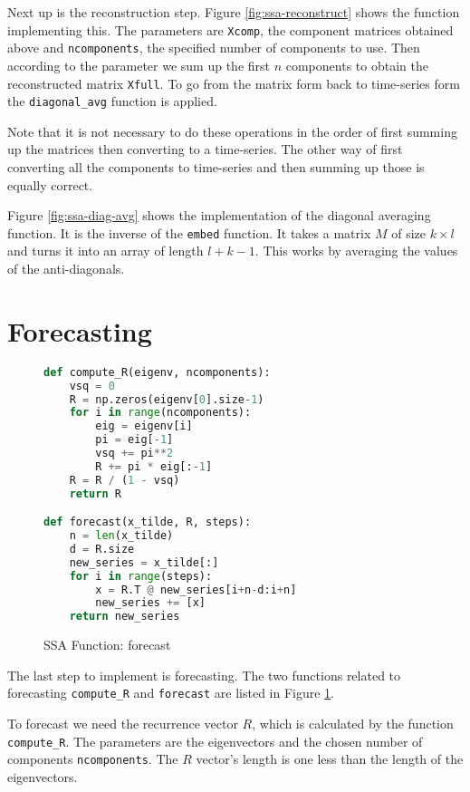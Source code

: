 Next up is the reconstruction step. Figure \ref{fig:ssa-reconstruct} shows the function implementing this. The parameters are \texttt{Xcomp}, the component matrices obtained above and \texttt{ncomponents}, the specified number of components to use. Then according to the parameter we sum up the first $n$ components to obtain the reconstructed matrix \texttt{Xfull}. To go from the matrix form back to time-series form the \texttt{diagonal\_avg} function is applied. 

Note that it is not necessary to do these operations in the order of first summing up the matrices then converting to a time-series. The other way of first converting all the components to time-series and then summing up those is equally correct. 

Figure \ref{fig:ssa-diag-avg} shows the implementation of the diagonal averaging function. It is the inverse of the \texttt{embed} function. It takes a matrix $M$ of size $k \times l$ and turns it into an array of length $l+k-1$. This works by averaging the values of the anti-diagonals. 

\section{Forecasting}

\begin{figure}
\begin{singlespace}
\begin{lstlisting}[language=Python]
def compute_R(eigenv, ncomponents):
    vsq = 0
    R = np.zeros(eigenv[0].size-1)
    for i in range(ncomponents):
        eig = eigenv[i]
        pi = eig[-1]
        vsq += pi**2
        R += pi * eig[:-1]
    R = R / (1 - vsq)
    return R

def forecast(x_tilde, R, steps):
    n = len(x_tilde)
    d = R.size
    new_series = x_tilde[:]
    for i in range(steps):
        x = R.T @ new_series[i+n-d:i+n]
        new_series += [x]
    return new_series
\end{lstlisting}
\end{singlespace}
\caption{SSA Function: forecast}    
\label{fig:ssa-forecast}
\end{figure}

The last step to implement is forecasting. The two functions related to forecasting \texttt{compute\_R} and \texttt{forecast} are listed in Figure \ref{fig:ssa-forecast}. 

To forecast we need the recurrence vector $R$, which is calculated by the function \texttt{compute\_R}. The parameters are the eigenvectors and the chosen number of components \texttt{ncomponents}. The $R$ vector's length is one less than the length of the eigenvectors. 

